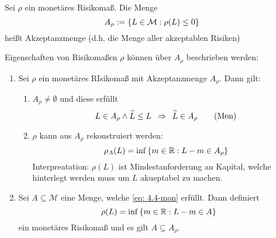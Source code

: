 \begin{*definition}
Sei $\rho$ ein monetäres Risikomaß. Die Menge 
\begin{equation*}
	A_\rho \mathrel{:=} \left\{ L \in \mathcal{M} : \rho(L) \le 0 \right\}
\end{equation*}
heißt Akzeptanzmenge (d.h. die Menge aller akzeptablen Risiken)
\end{*definition}

Eigenschaften von Risikomaßen $\rho$ können über $A_\rho$ beschrieben werden:
\begin{theorem}
\begin{enumerate}[label=\Roman*., nolistsep, leftmargin=*]
	\item Sei $\rho$ ein monetäres RIsikomaß mit Akzeptanzmenge $A_\rho$. Dann gilt:
	\begin{enumerate}[label=(\alph*)]
		\item $A_\rho \neq \emptyset$ und diese erfüllt
		\begin{equation*}
			L \in A_\rho \land \widetilde{L} \le L \enskip \Rightarrow \enskip \widetilde{L} \in A_\rho
			\tag{Mon} \label{eq: 4.4-mon}
		\end{equation*}
		\item $\rho$ kann aus $A_\rho$ rekonstruiert werden:
		\begin{equation*}
			\rho_A(L) = \inf\left\{ m \in \mathbb{R} : L - m \in A_\rho \right\}
		\end{equation*}
		Interpreatation: $\rho(L)$ ist Mindestanforderung an Kapital, welche hinterlegt werden muss um $L$ akueptabel zu machen.
	\end{enumerate}
	\item Sei $A \subseteq \mathcal{M}$ eine Menge, welche \eqref{eq: 4.4-mon} erfüllt. Dann definiert
	\begin{equation*}
		\rho(L) = \inf\left\{ m \in \mathbb{R} : L - m \in A \right\}
	\end{equation*}
	ein monetäres Risikomaß und es gilt $A \subseteq A_\rho$.
\end{enumerate}
\end{theorem}

